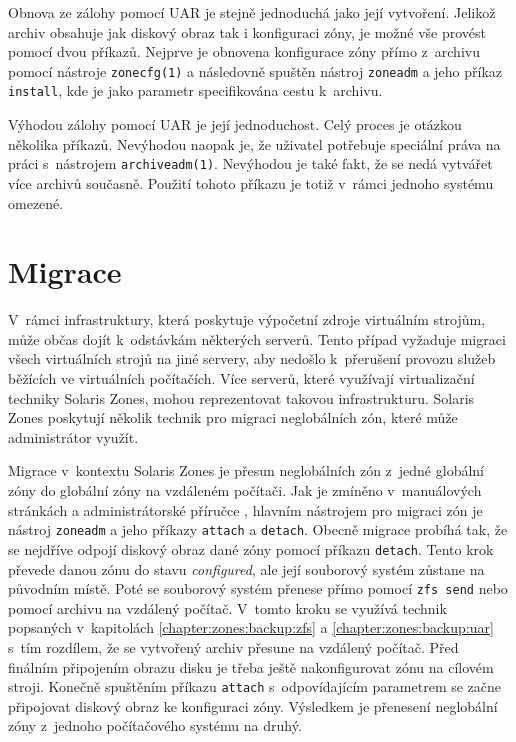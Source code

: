 Obnova ze zálohy pomocí UAR je stejně jednoduchá jako její vytvoření. Jelikož archiv obsahuje jak diskový obraz tak i konfiguraci
zóny, je možné vše provést pomocí dvou příkazů. Nejprve je obnovena konfigurace zóny přímo z~archivu pomocí nástroje \verb|zonecfg(1)|
a následovně spuštěn nástroj \verb|zoneadm| a jeho příkaz \verb|install|, kde je jako parametr specifikována cestu k~archivu.

Výhodou zálohy pomocí UAR je její jednoduchost. Celý proces je otázkou několika příkazů. Nevýhodou naopak je, že uživatel
potřebuje speciální práva na práci s~nástrojem \verb|archiveadm(1)|. Nevýhodou je také fakt, že se nedá vytvářet více archivů
současně. Použití tohoto příkazu je totiž v~rámci jednoho systému omezené.
\section{Migrace}
\label{chapter:zones:migration}
V~rámci infrastruktury, která poskytuje výpočetní zdroje virtuálním strojům, může občas dojít k~odstávkám některých serverů.
Tento případ vyžaduje migraci všech virtuálních strojů na jiné servery, aby nedošlo k~přerušení provozu služeb běžících ve 
virtuálních počítačích. Více serverů, které využívají virtualizační techniky Solaris Zones, mohou reprezentovat takovou infrastrukturu.
Solaris Zones poskytují několik technik pro migraci neglobálních zón, které může administrátor využít.

Migrace v~kontextu Solaris Zones je přesun neglobálních zón z~jedné globální zóny do globální zóny na vzdáleném počítači. Jak je
zmíněno v~manuálových stránkách \cite{oracle:manpages:zoneadm} a administrátorské příručce \cite{oracle:solaris:zones:migration},
hlavním nástrojem pro migraci zón je nástroj \verb|zoneadm| a jeho příkazy \verb|attach| a \verb|detach|. Obecně migrace
probíhá tak, že se nejdříve odpojí diskový obraz dané zóny pomocí příkazu \verb|detach|. Tento krok převede danou zónu
do stavu \textit{configured}, ale její souborový systém zůstane na původním místě. Poté se souborový systém přenese přímo pomocí
\verb|zfs send| nebo pomocí archivu na vzdálený počítač. V~tomto kroku se využívá technik popsaných v~kapitolách 
\ref{chapter:zones:backup:zfs} a \ref{chapter:zones:backup:uar} s~tím rozdílem, že se vytvořený archiv přesune na vzdálený
počítač. Před finálním připojením obrazu disku je třeba ještě nakonfigurovat zónu na cílovém stroji. Konečně spuštěním
příkazu \verb|attach| s~odpovídajícím parametrem se začne připojovat diskový obraz ke konfiguraci zóny. Výsledkem je  přenesení
neglobální zóny z~jednoho počítačového systému na druhý.